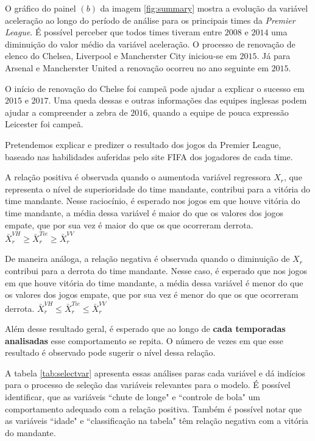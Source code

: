 \documentclass[doc,apacite,oneside,a4paper,12pt]{apa6}
\begin{document}
O gráfico do painel $(b)$ da imagem \ref{fig:summary} mostra a evolução da variável aceleração ao longo do período de análise para os principais times da \textit{Premier League}. É possível perceber que todos times tiveram entre $2008$ e $2014$ uma diminuição do valor médio da variável aceleração. O processo de renovação de elenco do Chelsea, Liverpool e Mancherster City iniciou-se em $2015$. Já para Arsenal e Mancherster United a renovação ocorreu no ano seguinte em $2015$.

O início de renovação do Chelse foi campeã pode ajudar a explicar o sucesso em $2015$ e $2017$. Uma queda dessas e outras informações das equipes inglesas podem ajudar a compreender a zebra de $2016$, quando a equipe de pouca expressão Leicester foi campeã. 

Pretendemos explicar e predizer o resultado dos jogos da Premier League, baseado nas habilidades auferidas pelo site FIFA dos jogadores de cada time.


A relação positiva é observada quando o aumentoda  variável regressora $X_r$, que representa o nível de superioridade do time mandante, contribui para a vitória do time mandante. Nesse raciocínio, é esperado nos jogos em que houve vitória do time mandante, a média dessa variável é maior do que os valores dos jogos empate, que por sua vez é maior do que os que ocorreram derrota. $\bar{X}_r^{VH}\geq \bar{X}_r^{Tie} \geq \bar{X}_r^{VV}$

 De maneira análoga, a relação negativa é observada quando o diminuição de $X_r$ contribui para a derrota do time mandante. Nesse caso, é esperado que nos jogos em que houve vitória do time mandante, a média dessa variável é menor do que os valores dos jogos empate, que por sua vez é menor do que os que ocorreram derrota. $\bar{X}_r^{VH} \leq \bar{X}_r^{Tie} \leq \bar{X}_r^{VV}$

Além desse resultado geral, é esperado que ao longo de \textbf{cada temporadas analisadas} esse comportamento se repita. O número de vezes em que esse resultado é observado pode sugerir o nível dessa relação.


A tabela \ref{tab:selectvar} apresenta essas análises paras cada variável e dá indícios para o processo de seleção das variáveis relevantes para o modelo. É possível identificar, que as variáveis ``chute de longe" e ``controle de bola" um comportamento adequado com a relação positiva. Também é possível notar que as variáveis ``idade" e ``classificação na tabela" têm relação negativa com a vitória do mandante.
\end{document}
